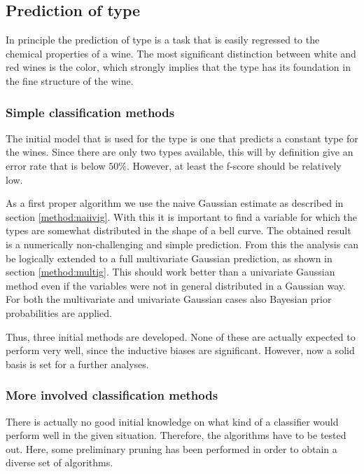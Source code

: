 \documentclass[twoside]{article}
\begin{document}
\begin{multicols}{2}
\subsection{Prediction of type}

In principle the prediction of type is a task that is easily regressed to the chemical properties of a wine.
The most significant distinction between white and red wines is the color, which strongly implies that the type 
has its foundation in the fine structure of the wine.

\subsubsection{Simple classification methods}

The initial model that is used for the type is one that predicts a constant type for the wines. 
Since there are only two types available, this will by definition give an error rate that is below $50\%$. However,
at least the f-score should be relatively low.

As a first proper algorithm we use the naive Gaussian estimate as described in section \ref{method:naiivig}. With this it is
important to find a variable for which the types are somewhat distributed in the shape of a bell curve. The obtained 
result is a numerically non-challenging and simple prediction. From this the analysis can be logically extended to a full
multivariate Gaussian prediction, as shown in section \ref{method:multig}. This should work better than a univariate
Gaussian method even if the variables were not in general distributed in a Gaussian way. For both the multivariate
and univariate Gaussian cases also Bayesian prior probabilities are applied.

Thus, three initial methods are developed. None of these are actually expected to perform very well, since the inductive
biases are significant. However, now a solid basis is set for a further analyses.

\subsubsection{More involved classification methods}

There is actually no good initial knowledge on what kind of a classifier
would perform well in the given situation. Therefore, the algorithms have to be tested out. Here, some preliminary 
pruning has been performed in order to obtain a diverse set of algorithms.


\end{multicols}
\end{document}
